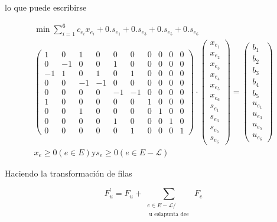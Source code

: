 \documentclass[10pt]{article}
\begin{document}
lo que puede escribirse

$$
\begin{gathered}
\min \sum_{i=1}^{6} c_{e_{i}} x_{e_{i}}+0 . s_{e_{1}}+0 . s_{e_{3}}+0 . s_{e_{5}}+0 . s_{e_{6}} \\
\left(\begin{array}{cccccccccc}
1 & 0 & 1 & 0 & 0 & 0 & 0 & 0 & 0 & 0 \\
0 & -1 & 0 & 0 & 1 & 0 & 0 & 0 & 0 & 0 \\
-1 & 1 & 0 & 1 & 0 & 1 & 0 & 0 & 0 & 0 \\
0 & 0 & -1 & -1 & 0 & 0 & 0 & 0 & 0 & 0 \\
0 & 0 & 0 & 0 & -1 & -1 & 0 & 0 & 0 & 0 \\
1 & 0 & 0 & 0 & 0 & 0 & 1 & 0 & 0 & 0 \\
0 & 0 & 1 & 0 & 0 & 0 & 0 & 1 & 0 & 0 \\
0 & 0 & 0 & 0 & 1 & 0 & 0 & 0 & 1 & 0 \\
0 & 0 & 0 & 0 & 0 & 1 & 0 & 0 & 0 & 1
\end{array}\right) \cdot\left(\begin{array}{l}
x_{e_{1}} \\
x_{e_{2}} \\
x_{e_{3}} \\
x_{e_{4}} \\
x_{e_{5}} \\
x_{e_{6}} \\
s_{e_{1}} \\
s_{e_{3}} \\
s_{e_{5}} \\
s_{e_{6}}
\end{array}\right)=\left(\begin{array}{c}
b_{1} \\
b_{2} \\
b_{3} \\
b_{4} \\
b_{5} \\
u_{e_{1}} \\
u_{e_{3}} \\
u_{e_{5}} \\
u_{e_{6}}
\end{array}\right) \\
x_{e} \geq 0(e \in E) \mathrm{y} s_{e} \geq 0(e \in E-\mathcal{L})
\end{gathered}
$$

Haciendo la transformación de filas

$$
F_{u}^{\prime}=F_{u}+\sum_{\substack{e \in E-\mathcal{L} / \\ \text { u eslapunta dee }}} F_{e}
$$
\end{document}
